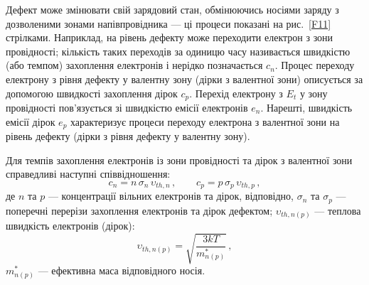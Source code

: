 Дефект може змінювати свій зарядовий стан, обмінюючись носіями заряду з дозволеними
зонами напівпровідника --- ці процеси показані на рис.~\ref{F11} стрілками.
Наприклад, на рівень дефекту може переходити електрон з зони провідності;
кількість таких переходів за одиницю часу називається швидкістю (або темпом) захоплення електронів
і нерідко позначається $c_n$.
Процес переходу електрону з рівня дефекту у валентну зону (дірки з валентної зони)
описується за допомогою швидкості захоплення дірок $c_p$.
Перехід електрону з $E_t$ у зону провідності пов'язується зі швидкістю емісії електронів $e_n$.
Нарешті, швидкість емісії дірок $e_p$ характеризує процеси переходу
електрона з валентної зони на рівень дефекту (дірки з рівня дефекту у валентну зону).

Для темпів захоплення електронів із зони провідності та дірок з валентної зони
справедливі наступні співвідношення:
\begin{equation}
\label{cnp}
 c_n=n\,\sigma_n\,\upsilon_{th,n}\,, \qquad c_p=p\,\sigma_p\,\upsilon_{th,p}\,,
\end{equation}
де
$n$ та $p$ --- концентрації вільних електронів та дірок, відповідно,
$\sigma_n$ та $\sigma_p$ --- поперечні перерізи захоплення електронів та дірок
дефектом;
$\upsilon_{th,n(p)}$ --- теплова швидкість електронів (дірок):
\begin{equation}
\label{Vth}
 \upsilon_{th,n(p)}=\sqrt{\frac{3kT}{m_{n(p)}^*}}\,,
\end{equation}
$m_{n(p)}^*$ --- ефективна маса відповідного носія.

